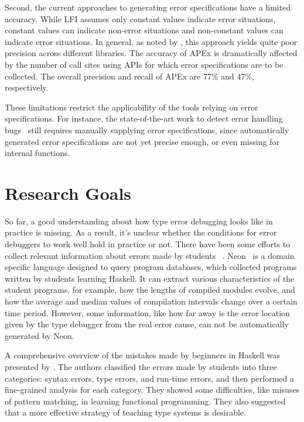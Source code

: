 \documentclass[12pt]{report}	%
\begin{document}
Second, the current approaches to generating error specifications 
have a limited accuracy.
While LFI assumes only constant values indicate error situations, 
constant values can indicate non-error situations and 
non-constant values can indicate error situations. 
In general, as noted by 
\cite{Kang:2016:AAI:2970276.2970354}, this approach
yields quite poor precision across different libraries. 
%
The accuracy of APEx is dramatically affected
by the number of call sites using APIs for which error specifications are to be
collected. 
The overall precision and recall
of APEx are 77\% and 47\%, respectively.

These limitations restrict the 
applicability of the tools relying on error specifications.
%
For instance, the state-of-the-art work to detect error handling bugs~\cite{jana2016automatically} still
requires manually supplying error specifications,
since automatically generated error specifications are not yet precise enough,
or even missing for internal functions.


\section{Research Goals}

So far, a good understanding about how type error debugging looks like
in practice is missing. As a result, it's unclear whether the conditions
for error debuggers to work well hold in practice or not.
%
There have been some efforts to collect relevant
information about errors made by students
~\cite{Hage09:Neon,tirronen2015understanding,chambers2012function,fenwick2009another,denny2012all}.
Neon~\cite{Hage09:Neon} is a domain specific language designed to query
program databases, which collected programs written by students learning Haskell.
It can extract various characteristics of the student programs,
for example, how the lengths of compiled modules evolve,
and how the average and median values of compilation intervals
change over a certain time period.
However, some information, like how far away is 
the error location
given by the type debugger from the real error cause,
can not be automatically generated by Neon.

A comprehensive overview of the mistakes made by beginners in Haskell was presented by \cite{tirronen2015understanding}.
The authors classified the errors made by students into three
categories: syntax errors, type errors, and run-time errors,
and then performed a fine-grained analysis for each category.
They showed some difficulties, like misuses of pattern matching,
in learning functional programming.
They also suggested that a more effective strategy of teaching type systems
is desirable.
\end{document}
